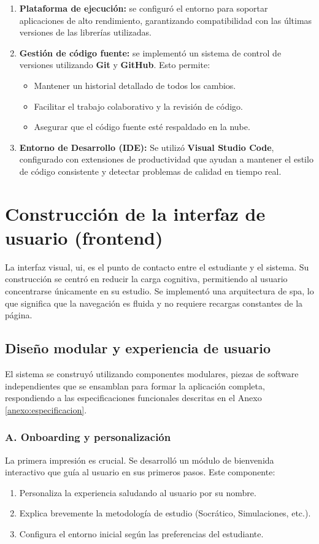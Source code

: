 \begin{enumerate}
\item \textbf{Plataforma de ejecución:} se configuró el entorno para soportar aplicaciones de alto rendimiento, garantizando compatibilidad con las últimas versiones de las librerías utilizadas.
\item \textbf{Gestión de código fuente:} se implementó un sistema de control de versiones utilizando \textbf{Git} y \textbf{GitHub}. Esto permite:
    \begin{itemize}
    \item Mantener un historial detallado de todos los cambios.
    \item Facilitar el trabajo colaborativo y la revisión de código.
    \item Asegurar que el código fuente esté respaldado en la nube.
    \end{itemize}
\item \textbf{Entorno de Desarrollo (IDE):} Se utilizó \textbf{Visual Studio Code}, configurado con extensiones de productividad que ayudan a mantener el estilo de código consistente y detectar problemas de calidad en tiempo real.
\end{enumerate}

\section{Construcción de la interfaz de usuario (frontend)}

La interfaz visual, \gls{ui}, es el punto de contacto entre el estudiante y el sistema. Su construcción se centró en reducir la carga cognitiva, permitiendo al usuario concentrarse únicamente en su estudio. Se implementó una arquitectura de \gls{spa}, lo que significa que la navegación es fluida y no requiere recargas constantes de la página.

\subsection{Diseño modular y experiencia de usuario}
El sistema se construyó utilizando componentes modulares, piezas de software independientes que se ensamblan para formar la aplicación completa, respondiendo a las especificaciones funcionales descritas en el Anexo \ref{anexo:especificacion}.

\subsubsection{A. Onboarding y personalización}
La primera impresión es crucial. Se desarrolló un módulo de bienvenida interactivo que guía al usuario en sus primeros pasos. Este componente:
\begin{enumerate}
\item Personaliza la experiencia saludando al usuario por su nombre.
\item Explica brevemente la metodología de estudio (Socrático, Simulaciones, etc.).
\item Configura el entorno inicial según las preferencias del estudiante.
\end{enumerate}

